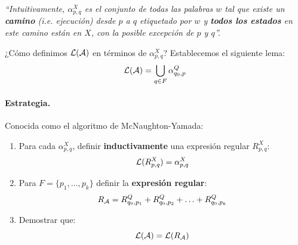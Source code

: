 \textit{``Intuitivamente, $\alpha_{p,q}^X$ es el conjunto de todas las palabras $w$ tal que existe un \textbf{camino} (i.e. ejecución) desde $p$ a $q$ etiquetado por $w$ y \textbf{todos los estados} en este camino están en $X$, con la posible excepción de $p$ y $q$''.} \medbreak

¿Cómo definimos $\mathcal{L}(\mathcal{A})$ en términos de $\alpha_{p,q}^X$? Establecemos el siguiente lema:
$$
    \mathcal{L}(\mathcal{A}) = \bigcup_{q \in F} \alpha_{q_0,p}^Q
$$

\paragraph{Estrategia.} Conocida como el algoritmo de McNaughton-Yamada:
\begin{enumerate}
    \item Para cada $\alpha_{p,q}^X$, definir \textbf{inductivamente} una expresión regular $R_{p,q}^X$:
          $$
              \mathcal{L}(R_{p,q}^X) = \alpha_{p,q}^X
          $$

    \item Para $F = \{p_1, \ldots, p_k\}$ definir la \textbf{expresión regular}:
          $$
              R_{\mathcal{A}} = R_{q_0, p_1}^Q+R_{q_0, p_2}^Q+\ldots+R_{q_0, p_k}^Q
          $$

    \item Demostrar que:
          $$
              \mathcal{L}(\mathcal{A}) = \mathcal{L}(R_{\mathcal{A}})
          $$
\end{enumerate}

